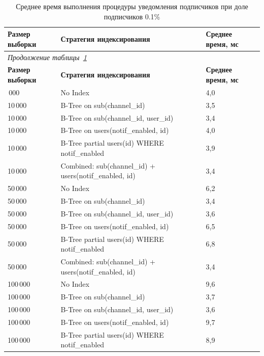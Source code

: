 \begin{longtable}{|p{2.4cm}|p{9.9cm}|p{2.3cm}|}
    \caption{Среднее время выполнения процедуры уведомления подписчиков при доле подписчиков 0.1\%}\label{tab:benchmark_avg_0_001} \\
    \hline
    \textbf{Размер выборки} & \textbf{Стратегия индексирования} & \textbf{Среднее время, мс} \\
    \hline
    \endfirsthead
    \multicolumn{3}{l}{\textit{Продолжение таблицы~\ref{tab:benchmark_avg_0_001}}} \\
    \hline
    \textbf{Размер выборки} & \textbf{Стратегия индексирования} & \textbf{Среднее время, мс} \\
    \hline
    \endhead
    \endfoot
    \endlastfoot
    10\,000 & No Index & 4,0 \\
    \hline
    10\,000 & B-Tree on sub(channel\_id) & 3,5 \\
    \hline
    10\,000 & B-Tree on sub(channel\_id, user\_id) & 3,4 \\
    \hline
    10\,000 & B-Tree on users(notif\_enabled, id) & 4,0 \\
    \hline
    10\,000 & B-Tree partial users(id) WHERE notif\_enabled & 3,9 \\
    \hline
    10\,000 & Combined: sub(channel\_id) + users(notif\_enabled, id) & 3,4 \\
    \hline
    50\,000 & No Index & 6,2 \\
    \hline
    50\,000 & B-Tree on sub(channel\_id) & 3,4 \\
    \hline
    50\,000 & B-Tree on sub(channel\_id, user\_id) & 3,6 \\
    \hline
    50\,000 & B-Tree on users(notif\_enabled, id) & 6,5 \\
    \hline
    50\,000 & B-Tree partial users(id) WHERE notif\_enabled & 6,8 \\
    \hline
    50\,000 & Combined: sub(channel\_id) + users(notif\_enabled, id) & 3,4 \\
    \hline
    100\,000 & No Index & 9,6 \\
    \hline
    100\,000 & B-Tree on sub(channel\_id) & 3,7 \\
    \hline
    100\,000 & B-Tree on sub(channel\_id, user\_id) & 3,6 \\
    \hline
    100\,000 & B-Tree on users(notif\_enabled, id) & 9,7 \\
    \hline
    100\,000 & B-Tree partial users(id) WHERE notif\_enabled & 8,9 \\
    \hline

\end{longtable}

